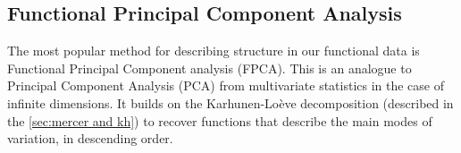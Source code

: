 \subsection{Functional Principal Component Analysis}
\label{sec:fpca}
The most popular method for describing structure in our functional data is Functional
Principal Component analysis (FPCA). This is an analogue to Principal Component Analysis
(PCA) from multivariate statistics in the case of infinite dimensions. It builds on the
Karhunen-Loève decomposition (described in the \ref{sec:mercer and kh}) to recover functions
that describe the main modes of variation, in descending order.
